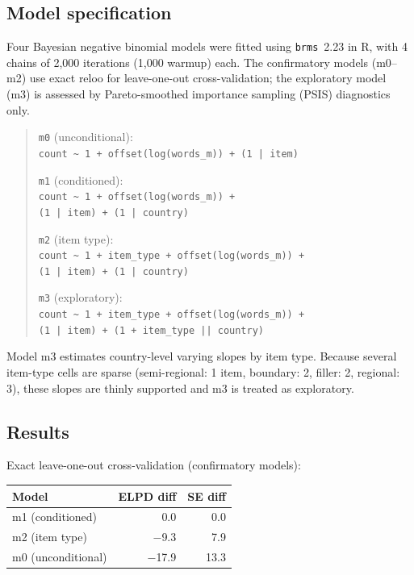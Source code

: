 \documentclass[12pt]{article}
\begin{document}
\subsection{Model specification}

Four Bayesian negative binomial models were fitted using
\texttt{brms}~2.23 in R, with 4 chains of 2{,}000 iterations (1{,}000
warmup) each. The confirmatory models (m0--m2) use exact reloo for
leave-one-out cross-validation; the exploratory model (m3) is assessed
by Pareto-smoothed importance sampling (PSIS) diagnostics only.

\begin{quote}
\small
\noindent\texttt{m0} (unconditional):\\
\texttt{count \textasciitilde{} 1 + offset(log(words\_m)) + (1~|~item)}

\noindent\texttt{m1} (conditioned):\\
\texttt{count \textasciitilde{} 1 + offset(log(words\_m)) +}\\
\texttt{(1~|~item) + (1~|~country)}

\noindent\texttt{m2} (item type):\\
\texttt{count \textasciitilde{} 1 + item\_type + offset(log(words\_m)) +}\\
\texttt{(1~|~item) + (1~|~country)}

\noindent\texttt{m3} (exploratory):\\
\texttt{count \textasciitilde{} 1 + item\_type + offset(log(words\_m)) +}\\
\texttt{(1~|~item) + (1~+~item\_type~||~country)}
\end{quote}

Model m3 estimates country-level varying slopes by item type. Because
several item-type cells are sparse (semi-regional: 1 item, boundary: 2,
filler: 2, regional: 3), these slopes are thinly supported and m3 is
treated as exploratory.

\subsection{Results}

Exact leave-one-out cross-validation (confirmatory models):

\begin{center}
\begin{tabular}{lrr}
  \hline
  Model & ELPD diff & SE diff \\
  \hline
  m1 (conditioned) & 0.0 & 0.0 \\
  m2 (item type) & $-$9.3 & 7.9 \\
  m0 (unconditional) & $-$17.9 & 13.3 \\
  \hline
\end{tabular}
\end{center}
\end{document}

